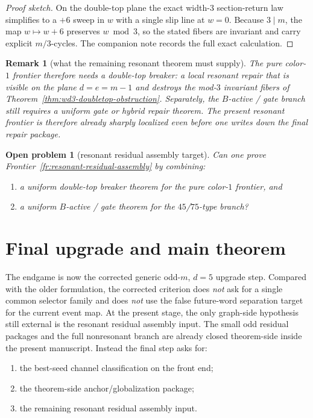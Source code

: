 \documentclass[11pt]{article}
\newtheorem{remark}[theorem]{Remark}
\newtheorem{question}[theorem]{Open problem}
\begin{document}
\begin{proof}[Proof sketch]
On the double-top plane the exact width-$3$ section-return law simplifies to a
$+6$ sweep in $w$ with a single slip line at $w=0$.
Because $3\mid m$, the map $w\mapsto w+6$ preserves $w\bmod 3$, so the stated
fibers are invariant and carry explicit $m/3$-cycles.
The companion note records the full exact calculation.
\end{proof}

\begin{remark}[what the remaining resonant theorem must supply]
The pure color-$1$ frontier therefore needs a \emph{double-top breaker}: a
local resonant repair that is visible on the plane $d=e=m-1$ and destroys the
mod-$3$ invariant fibers of Theorem~\ref{thm:wd3-doubletop-obstruction}.
Separately, the $B$-active / gate branch still requires a uniform gate or
hybrid repair theorem.
The present resonant frontier is therefore already sharply localized even before
one writes down the final repair package.
\end{remark}

\begin{question}[resonant residual assembly target]
\label{q:resonant-target}
Can one prove Frontier~\ref{fr:resonant-residual-assembly} by combining:
\begin{enumerate}[label=\textup{(\arabic*)},leftmargin=2.8em]
\item a uniform double-top breaker theorem for the pure color-$1$ frontier, and
\item a uniform $B$-active / gate theorem for the $45$/$75$-type branch?
\end{enumerate}
\end{question}

\section{Final upgrade and main theorem}

The endgame is now the corrected generic odd-$m$, $d=5$ upgrade step.
Compared with the older formulation, the corrected criterion does \emph{not}
ask for a single common selector family and does \emph{not} use the false
future-word separation target for the current event map.
At the present stage, the only graph-side hypothesis still external is the
resonant residual assembly input.
The small odd residual packages and the full nonresonant branch are already
closed theorem-side inside the present manuscript.
Instead the final step asks for:
\begin{enumerate}[label=\textup{(\arabic*)},leftmargin=2.8em]
\item the best-seed channel classification on the front end;
\item the theorem-side anchor/globalization package;
\item the remaining resonant residual assembly input.
\end{enumerate}
\end{document}
